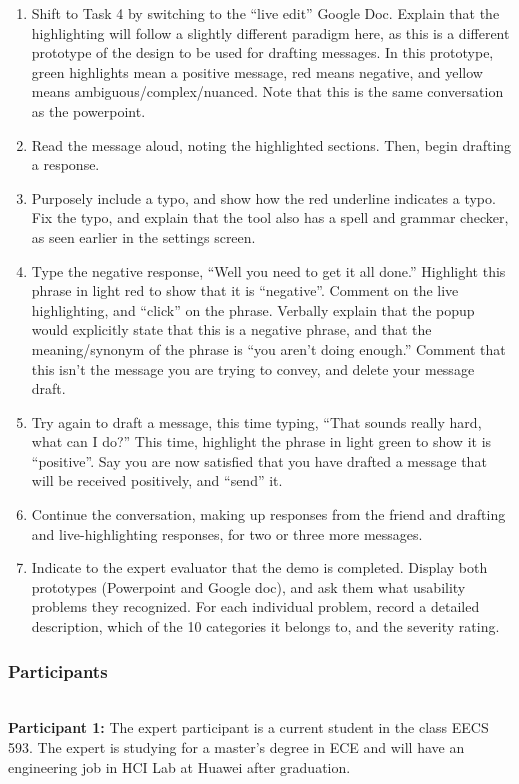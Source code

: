 \documentclass[acmsmall,screen,authorversion,nonacm]{acmart}
\begin{document}
\begin{enumerate}[label*=(\arabic*)]
    \item Shift to Task 4 by switching to the “live edit” Google Doc. Explain that the highlighting will follow a slightly different paradigm here, as this is a different prototype of the design to be used for drafting messages. In this prototype, green highlights mean a positive message, red means negative, and yellow means ambiguous/complex/nuanced. Note that this is the same conversation as the powerpoint.
    \item Read the message aloud, noting the highlighted sections. Then, begin drafting a response. 
    \item Purposely include a typo, and show how the red underline indicates a typo. Fix the typo, and explain that the tool also has a spell and grammar checker, as seen earlier in the settings screen.
    \item Type the negative response, “Well you need to get it all done.” Highlight this phrase in light red to show that it is “negative”. Comment on the live highlighting, and “click” on the phrase. Verbally explain that the popup would explicitly state that this is a negative phrase, and that the meaning/synonym of the phrase is “you aren’t doing enough.” Comment that this isn’t the message you are trying to convey, and delete your message draft.
    \item Try again to draft a message, this time typing, “That sounds really hard, what can I do?” This time, highlight the phrase in light green to show it is “positive”. Say you are now satisfied that you have drafted a message that will be received positively, and “send” it. 
    \item Continue the conversation, making up responses from the friend and drafting and live-highlighting responses, for two or three more messages.
    \item Indicate to the expert evaluator that the demo is completed. Display both prototypes (Powerpoint and Google doc), and ask them what usability problems they recognized. For each individual problem, record a detailed description, which of the 10 categories it belongs to, and the severity rating. 
\end{enumerate}

\subsubsection{Participants}
\\
\textbf{Participant 1: }The expert participant is a current student in the class EECS 593. The expert is studying for a master’s degree in ECE and will have an engineering job in HCI Lab at Huawei after graduation. 
\end{document}
